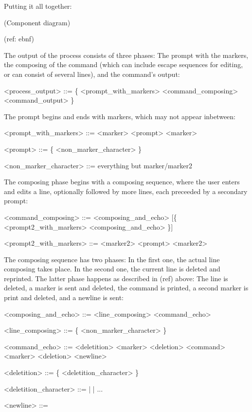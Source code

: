 \documentclass[paper=a4,abstract=on,cleardoublepage=empty,numbers=noenddot,toc=bib]{scrreprt}
\begin{document}
Putting it all together:

(Component diagram)

(ref: ebnf)


The output of the process consists of three phases: The prompt with the markers, the composing of the command (which can include escape sequences for editing, or can consist of several lines), and the command's output:

\begin{grammar}
<process_output> ::= \{ <prompt_with_markers> <command_composing> <command_output> \}
\end{grammar}

The prompt begins and ends with markers, which may not appear inbetween:

\begin{grammar}
<prompt_with_markers> ::= <marker> <prompt> <marker>

<prompt> ::= \{ <non_marker_character> \}

<non_marker_character> ::= everything but marker/marker2
\end{grammar}

The composing phase begins with a composing sequence, where the user enters and edits a line, optionally followed by more lines, each preceeded by a secondary prompt:

\begin{grammar}
<command_composing> ::= <composing_and_echo> [\{ <prompt2_with_markers> <composing_and_echo> \}]

<prompt2_with_markers> ::= <marker2> <prompt> <marker2>
\end{grammar}

The composing sequence has two phases: In the first one, the actual line composing takes place. In the second one, the current line is deleted and reprinted. The latter phase happens as described in (ref) above: The line is deleted, a marker is sent and deleted, the command is printed, a second marker is print and deleted, and a newline is sent:

\begin{grammar}
<composing_and_echo> ::= <line_composing> <command_echo>

<line_composing> ::= \{ <non_marker_character> \}

<command_echo> ::= <deletition> <marker> <deletion> <command> <marker> <deletion> <newline>

<deletition> ::= \{ <deletition_character> \}

<deletition_character> ::=  |  | ...

<newline> ::= 
\end{grammar}
\end{document}
